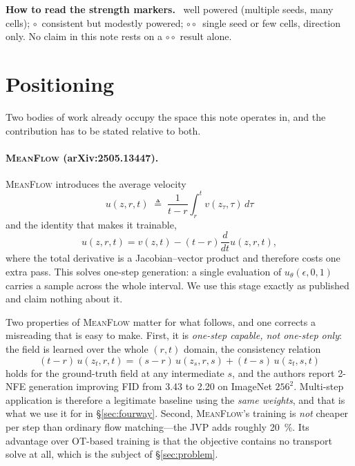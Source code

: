 ﻿\documentclass[11pt,a4paper]{article}
\newcommand{\mf}{\textsc{MeanFlow}}
\newcommand{\strong}{\textcolor{green!35!black}{\textbullet\!\textbullet\!\textbullet}}
\newcommand{\medium}{\textcolor{orange!80!black}{\textbullet\!\textbullet$\circ$}}
\newcommand{\weak}{\textcolor{red!65!black}{\textbullet$\circ\circ$}}
\begin{document}
\vspace{0.2cm}
\noindent\textbf{How to read the strength markers.}
\strong{}~well powered (multiple seeds, many cells);
\medium{}~consistent but modestly powered;
\weak{}~single seed or few cells, direction only.
No claim in this note rests on a \weak{} result alone.

\tableofcontents
\newpage

\section{Positioning}

Two bodies of work already occupy the space this note operates in, and the contribution has
to be stated relative to both.

\paragraph{\mf{} (arXiv:2505.13447).}
\mf{} introduces the average velocity
\begin{equation}
u(z,r,t)\;\triangleq\;\frac{1}{t-r}\int_{r}^{t}v(z_\tau,\tau)\,d\tau
\end{equation}
and the identity that makes it trainable,
\begin{equation}
u(z,r,t)=v(z,t)-(t-r)\frac{d}{dt}u(z,r,t),
\label{eq:mf-identity}
\end{equation}
where the total derivative is a Jacobian--vector product and therefore costs one extra pass.
This solves one-step generation: a single evaluation of $u_\theta(\epsilon,0,1)$ carries a
sample across the whole interval. We use this stage exactly as published and claim nothing
about it.

Two properties of \mf{} matter for what follows, and one corrects a misreading that is easy to
make. First, it is \emph{one-step capable, not one-step only}: the field is learned over the
whole $(r,t)$ domain, the consistency relation
\begin{equation}
(t-r)\,u(z_t,r,t)=(s-r)\,u(z_s,r,s)+(t-s)\,u(z_t,s,t)
\label{eq:consistency}
\end{equation}
holds for the ground-truth field at any intermediate $s$, and the authors report 2-NFE
generation improving FID from 3.43 to 2.20 on ImageNet $256^2$. Multi-step application is
therefore a legitimate baseline using the \emph{same weights}, and that is what we use it for
in \S\ref{sec:fourway}. Second, \mf{}'s training is \emph{not} cheaper per step than ordinary
flow matching---the JVP adds roughly \SI{20}{\percent}. Its advantage over OT-based training is
that the objective contains no transport solve at all, which is the subject of
\S\ref{sec:problem}.
\end{document}
